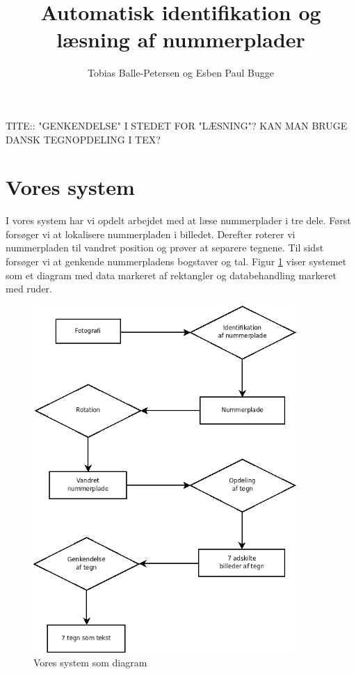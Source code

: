 \documentclass[11pt,a4paper,final]{article}
\author{Tobias Balle-Petersen og Esben Paul Bugge}
\title{Automatisk identifikation og læsning af nummerplader}
\begin{document}
\maketitle
\newpage
\tableofcontents
\newpage

TITE:: "GENKENDELSE" I STEDET FOR "LÆSNING"?
KAN MAN BRUGE DANSK TEGNOPDELING I TEX?



\section{Vores system}
I vores system har vi opdelt arbejdet med at læse nummerplader i tre dele. Først forsøger vi at lokalisere nummerpladen i billedet. Derefter roterer vi nummerpladen til vandret position og prøver at separere tegnene. Til sidst forsøger vi at genkende nummerpladens bogstaver og tal. Figur \ref{fig:system_overblik} viser systemet som et diagram med data markeret af rektangler og databehandling markeret med ruder.

\begin{figure}[htp]
\centering
\includegraphics[width=10cm]{system/illu/overordnet_system.png} 
\caption{Vores system som diagram}
\label{fig:system_overblik}
\end{figure}
\end{document}

